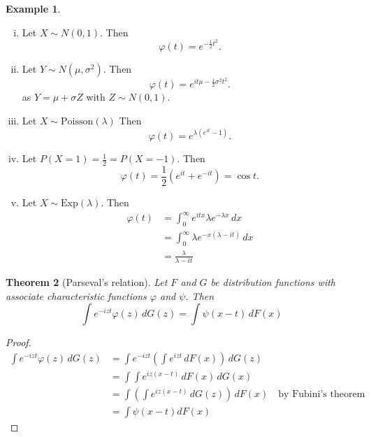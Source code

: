\documentclass[10pt, oneside, reqno]{amsart}
\theoremstyle{plain}%
\newtheorem{thm}{Theorem}[section]
\theoremstyle{definition}
\newtheorem{exmp}[thm]{Example}
\theoremstyle{remark}
\renewcommand{\phi}{\varphi}
\begin{document}
\begin{exmp}
	\begin{enumerate}[(i)]
		\item Let $X \sim N(0,1)$.  Then \[\phi(t) = e^{-\frac{1}{2}t^2}.
		\]  
		\item Let $Y \sim N(\mu, \sigma^2)$.  Then \[
			\phi(t) = e^{it\mu - \frac{1}{2} \sigma^2 t^2}.
		\] as $Y = \mu + \sigma Z$ with $Z \sim N(0,1)$.
		\item Let $X \sim \text{Poisson}(\lambda)$  Then \[
			\phi(t) = e^{\lambda(e^{it} - 1)}.
		\]
		\item Let $P(X= 1) = \frac{1}{2} = P(X = -1)$.  Then \[
			\phi(t) = \frac{1}{2}\left(e^{it} + e^{-it} \right) = \cos t. 
		\]
		\item Let $X \sim \text{Exp}(\lambda)$.  Then \begin{align*}
			\phi(t) &= \int_0^\infty e^{itx} \lambda e^{-\lambda x} \, dx \\
					&= \int_0^\infty \lambda e^{-x(\lambda - it)} \, dx \\
					&= \frac{\lambda}{\lambda - it} 
		\end{align*}
	\end{enumerate}
\end{exmp}

\begin{thm}[Parseval's relation]
	Let $F$ and $G$ be distribution functions with associate characteristic functions $\phi$ and $\psi$.  Then \[
		\int e^{-izt} \phi(z) \, dG(z) = \int \psi(x - t) \, dF(x)
	\]
\end{thm}
\begin{proof}
	\begin{align*}
	\int e^{-izt} \phi(z) \, dG(z)
		  	&= \int e^{-izt} \left(\int e^{izt} \, dF(x) \right) \, dG(z) \\
			&= \int \int e^{iz(x-t)} \, dF(x) \, dG(x) \\
			&= \int \left( \int e^{iz(x-t)} \, dG(z) \right) \, dF(x) \quad \text{by Fubini's theorem}\\
			&= \int \psi(x-t) dF(x)
	\end{align*}
\end{proof}
\end{document}

